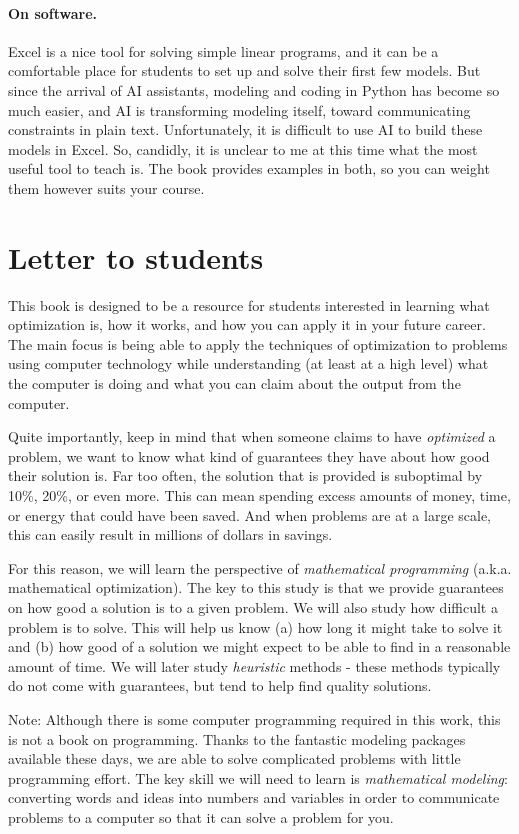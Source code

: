 \paragraph{On software.}
Excel is a nice tool for solving simple linear programs, and it can be a comfortable place for students to set up and solve their first few models.  But since the arrival of AI assistants, modeling and coding in Python has become so much easier, and AI is transforming modeling itself, toward communicating constraints in plain text.  Unfortunately, it is difficult to use AI to build these models in Excel.  So, candidly, it is unclear to me at this time what the most useful tool to teach is.  The book provides examples in both, so you can weight them however suits your course.

\section*{Letter to students}

This book is designed to be a resource for students interested in learning what optimization is, how it works, and how you can apply it in your future career.  The main focus is being able to apply the techniques of optimization to problems using computer technology while understanding (at least at a high level) what the computer is doing and what you can claim about the output from the computer.

Quite importantly, keep in mind that when someone claims to have \emph{optimized} a problem, we want to know what kind of guarantees they have about how good their solution is.  Far too often, the solution that is provided is suboptimal by 10\%, 20\%, or even more.  This can mean spending excess amounts of money, time, or energy that could have been saved. And when problems are at a large scale, this can easily result in millions of dollars in savings.

For this reason, we will learn the perspective of \emph{mathematical programming} (a.k.a. mathematical optimization).  The key to this study is that we provide guarantees on how good a solution is to a given problem.  We will also study how difficult a problem is to solve.  This will help us know (a) how long it might take to solve it and (b) how good of a solution we might expect to be able to find in a reasonable amount of time. We will later study \emph{heuristic} methods - these methods typically do not come with guarantees, but tend to help find quality solutions.

Note: Although there is some computer programming required in this work, this is not a book on programming.   Thanks to the fantastic modeling packages available these days, we are able to solve complicated problems with little programming effort.   The key skill we will need to learn is \emph{mathematical modeling}: converting words and ideas into numbers and variables in order to communicate problems to a computer so that it can solve a problem for you.  

